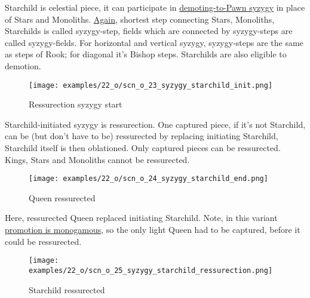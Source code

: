 Starchild is celestial piece, it can participate in
\hyperref[fig:scn_d_15_syzygy_2_stars_init]{demoting-to-Pawn syzygy} in place of Stars and Monoliths.
\hyperref[fig:scn_d_17_syzygy_2_monoliths_init]{Again}, shortest step connecting Stars, Monoliths,
Starchilds is called syzygy-step, fields which are connected by syzygy-steps are called syzygy-fields.
For horizontal and vertical syzygy, syzygy-steps are the same as steps of Rook; for diagonal it’s
Bishop steps. Starchilds are also eligible to demotion.

\clearpage %

\vspace*{-2.1\baselineskip}
\noindent
\begin{figure}[!h]
\texttt{[image: examples/22\_o/scn\_o\_23\_syzygy\_starchild\_init.png]}
\caption{Ressurection syzygy start}
\label{fig:scn_o_23_syzygy_starchild_init}
\end{figure}

Starchild-initiated syzygy is ressurection. One captured piece, if it's not Starchild, can be (but
don't have to be) ressurected by replacing initiating Starchild, Starchild itself is then oblationed.
Only captured pieces can be ressurected. Kings, Stars and Monoliths cannot be ressurected.

\clearpage %

\vspace*{-2.1\baselineskip}
\noindent
\begin{figure}[!h]
\texttt{[image: examples/22\_o/scn\_o\_24\_syzygy\_starchild\_end.png]}
\caption{Queen ressurected}
\label{fig:scn_o_24_syzygy_starchild_end}
\end{figure}

Here, ressurected Queen replaced initiating Starchild. Note, in this variant
\hyperref[sec:One/Promotion]{promotion is monogamous}, so the only light Queen
had to be captured, before it could be ressurected.

\clearpage %

\vspace*{-2.1\baselineskip}
\noindent
\begin{figure}[!h]
\texttt{[image: examples/22\_o/scn\_o\_25\_syzygy\_starchild\_ressurection.png]}
\caption{Starchild ressurected}
\label{fig:scn_o_25_syzygy_starchild_ressurection}
\end{figure}


